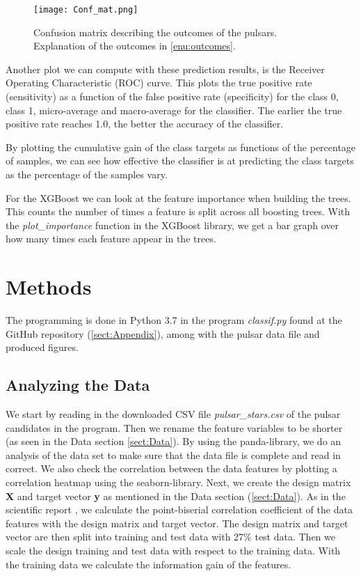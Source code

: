 \documentclass[12pt,a4paper,english]{article}
\begin{document}
\begin{figure}[h!]
	\centering\texttt{[image: Conf\_mat.png]}
	\caption{Confusion matrix describing the outcomes of the pulsars. Explanation of the outcomes in \ref{enu:outcomes}. \label{fig:conf_mat}}
\end{figure} 

Another plot we can compute with these prediction results, is the Receiver Operating Characteristic (ROC) curve. This plots the true positive rate (sensitivity) as a function of the false positive rate (specificity) for the class 0, class 1, micro-average and macro-average for the classifier. The earlier the true positive rate reaches 1.0, the better the accuracy of the classifier.

By plotting the cumulative gain of the class targets as functions of the percentage of samples, we can see how effective the classifier is at predicting the class targets as the percentage of the samples vary.

For the XGBoost we can look at the feature importance when building the trees. This counts the number of times a feature is split across all boosting trees. With the \textit{plot\_importance} function in the XGBoost library, we get a bar graph over how many times each feature appear in the trees.


\section{Methods}
\label{sect:Methods}
The programming is done in Python 3.7 in the program \textit{classif.py} found at the GitHub repository (\ref{sect:Appendix}), among with the pulsar data file and produced figures.

\subsection{Analyzing the Data}
\label{subsect:analysis}
We start by reading in the downloaded CSV file \textit{pulsar\_stars.csv} of the pulsar candidates in the program. Then we rename the feature variables to be shorter (as seen in the Data section \ref{sect:Data}). By using the panda-library, we do an analysis of the data set to make sure that the data file is complete and read in correct. We also check the correlation between the data features by plotting a correlation heatmap using the seaborn-library. Next, we create the design matrix \textbf{X} and target vector \textbf{y} as mentioned in the Data section (\ref{sect:Data}). As in the scientific report \cite{pulsar_art}, we calculate the point-biserial correlation coefficient of the data features with the design matrix and target vector. The design matrix and target vector are then split into training and test data with 27\% test data. Then we scale the design training and test data with respect to the training data. With the training data we calculate the information gain of the features.
\end{document}

